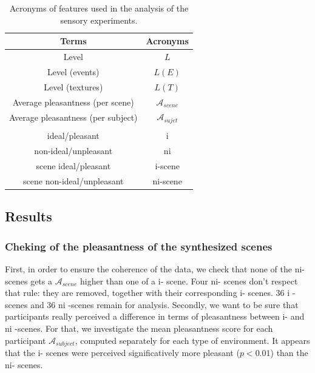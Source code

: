 \documentclass[twoside,twocolumn]{article}
\begin{document}
\begin{table}[t]
\centering
\begin{tabular}{c c}
Terms                         & Acronyms              \\
\hline
Level                        & $L$                    \\
Level (events)            & $L(E)$                 \\
Level (textures)              & $L(T)$                 \\
Average pleasantness (per scene)     & $\mathcal{A}_{scene}$  \\
Average pleasantness (per subject)     & $\mathcal{A}_{sujet}$  \\
                               &                        \\
ideal/pleasant                & i                      \\
non-ideal/unpleasant         & ni                     \\
scene ideal/pleasant          & i-scene                \\
scene non-ideal/unpleasant   & ni-scene               \\
\hline
\end{tabular}
\vspace{0.5mm}
\caption{Acronyms of features used in the analysis of the sensory experiments.}
\label{tab:acronyme}
\end{table}

\subsection{Results}

\subsubsection*{Cheking of the pleasantness of the synthesized scenes}

First, in order to ensure the coherence of the data, we check that none of the ni- scenes gets a $\mathcal{A}_{scene}$ higher than one of a i- scene. Four ni- scenes don’t respect that rule: they are removed, together with their corresponding i- scenes. 36 i -scenes and 36 ni -scenes remain for analysis. Secondly, we want to be sure that participants really perceived a difference in terms of pleasantness between i- and ni -scenes. For that, we investigate the mean pleasantness score for each participant $\mathcal{A}_{subject}$, computed separately for each type of environment. It appears that the i- scenes were perceived significatively more pleasant ($p < 0.01$) than the ni- scenes.
\end{document}
